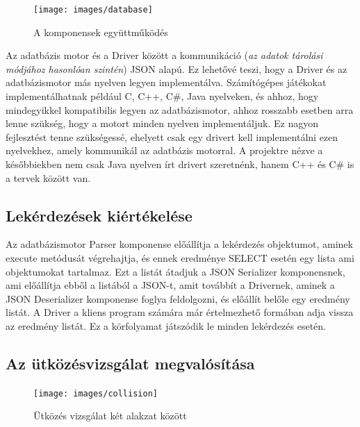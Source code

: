 \begin{figure}[htb]
	\begin{center}
		\texttt{[image: images/database]}
		\caption{A komponensek együttműködés}
		\label{fig:database}
	\end{center}
\end{figure}

Az adatbázis motor és a Driver között a kommunikáció (\textit{az adatok tárolási módjához hasonlóan szintén}) JSON alapú. Ez lehetővé teszi, hogy a Driver és az adatbázismotor más nyelven legyen implementálva. Számítógépes játékokat implementálhatnak például C, C++, C\#, Java nyelveken, és ahhoz, hogy mindegyikkel kompatibilis legyen az adatbázismotor, ahhoz rosszabb esetben arra lenne szükség, hogy a motort minden nyelven implementáljuk. Ez nagyon fejlesztést tenne szükségessé, ehelyett csak egy drivert kell implementálni ezen nyelvekhez, amely kommunikál az adatbázis motorral. A projektre nézve a későbbiekben nem csak Java nyelven írt drivert szeretnénk, hanem C++ és C\# is a tervek között van.

\subsection{Lekérdezések kiértékelése}

Az adatbázismotor Parser komponense előállítja a lekérdezés objektumot, aminek execute metódusát végrehajtja, és ennek eredménye SELECT esetén egy lista ami objektumokat tartalmaz. Ezt a listát átadjuk a JSON Serializer komponensnek, ami előállítja ebből a listából a JSON-t, amit továbbít a Drivernek, aminek a JSON Deserializer komponense foglya feldolgozni, és előállít belőle egy eredmény listát. A Driver a kliens program számára már értelmezhető formában adja vissza az eredmény listát. Ez a körfolyamat játszódik le minden lekérdezés esetén.

\subsection{Az ütközésvizsgálat megvalósítása}

\begin{figure}[htb]
\begin{center}
    \texttt{[image: images/collision]}
    \caption{Ütközés vizsgálat két alakzat között}
    \label{fig:collision}
\end{center}
\end{figure}

